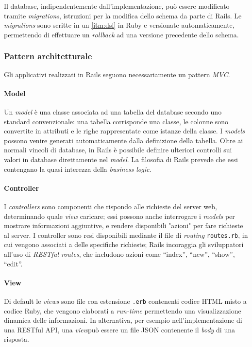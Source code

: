 Il database, indipendentemente dall'implementazione, può essere modificato tramite \textit{migrations}, istruzioni per la modifica dello schema da parte di Rails. Le \textit{migrations} sono scritte in un \ref{itm:dsl} in Ruby e versionate automaticamente, permettendo di effettuare un \textit{rollback} ad una versione precedente dello schema.
 
\subsubsection{Pattern architetturale}
Gli applicativi realizzati in Rails seguono necessariamente un pattern \textit{MVC}.
\paragraph{Model}
Un \textit{model} è una classe associata ad una tabella del database secondo uno standard convenzionale: una tabella corrisponde una classe, le colonne sono convertite in attributi e le righe rappresentate come istanze della classe. I \textit{models} possono venire generati automaticamente dalla definizione della tabella. Oltre ai normali vincoli di database, in Rails è possibile definire ulteriori controlli sui valori in database direttamente nel \textit{model}. La filosofia di Rails prevede che essi contengano la quasi interezza della \textit{business logic}.

\paragraph{Controller}
I \textit{controllers} sono componenti che rispondo alle richieste del server web, determinando quale \textit{view} caricare; essi possono anche interrogare i \textit{models} per mostrare informazioni aggiuntive, e rendere disponibili "azioni" per fare richieste al server. I controller sono resi disponibili mediante il file di \textit{routing} \texttt{routes.rb}, in cui vengono associati a delle specifiche richieste; Rails incoraggia gli sviluppatori all'uso di \textit{RESTful routes}, che includono azioni come ``index'', ``new'', ``show'', ``edit''.

\paragraph{View}
Di default le \textit{views} sono file con estensione \texttt{.erb} contenenti codice HTML misto a codice Ruby, che vengono elaborati a \textit{run-time} permettendo una visualizzazione dinamica delle informazioni. In alternativa, per esempio nell'implementazione di una RESTful API, una \textit{view}può essere un file JSON contenente il \textit{body} di una risposta.

